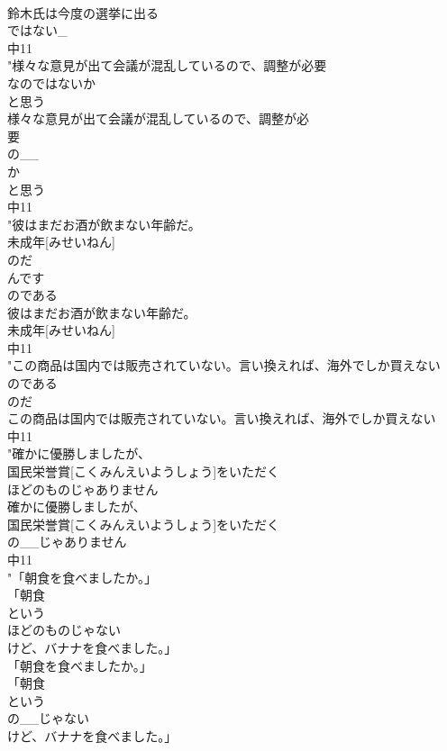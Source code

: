 \documentclass[8pt]{extreport}
\begin{document}
\begin{CJK}{UTF8}{min}
\\	鈴木氏は今度の選挙に出る
\\	ではない_
\\	中11
\\	"様々な意見が出て会議が混乱しているので、調整が必要
\\	なのではないか
\\	と思う
\\	様々な意見が出て会議が混乱しているので、調整が必
\\	要
\\	の__
\\	か
\\	と思う
\\	中11
\\	"彼はまだお酒が飲まない年齢だ。
\\	未成年[みせいねん]
\\	のだ
\\	んです
\\	のである
\\	彼はまだお酒が飲まない年齢だ。
\\	未成年[みせいねん]
\\	中11
\\	"この商品は国内では販売されていない。言い換えれば、海外でしか買えない
\\	のである
\\	のだ
\\	この商品は国内では販売されていない。言い換えれば、海外でしか買えない
\\	中11
\\	"確かに優勝しましたが、
\\	国民栄誉賞[こくみんえいようしょう]をいただく
\\	ほどのものじゃありません
\\	確かに優勝しましたが、
\\	国民栄誉賞[こくみんえいようしょう]をいただく
\\	の__じゃありません
\\	中11
\\	"「朝食を食べましたか。」
\\	「朝食
\\	という
\\	ほどのものじゃない
\\	けど、バナナを食べました。」
\\	「朝食を食べましたか。」
\\	「朝食
\\	という
\\	の__じゃない
\\	けど、バナナを食べました。」

\end{CJK}
\end{document}
